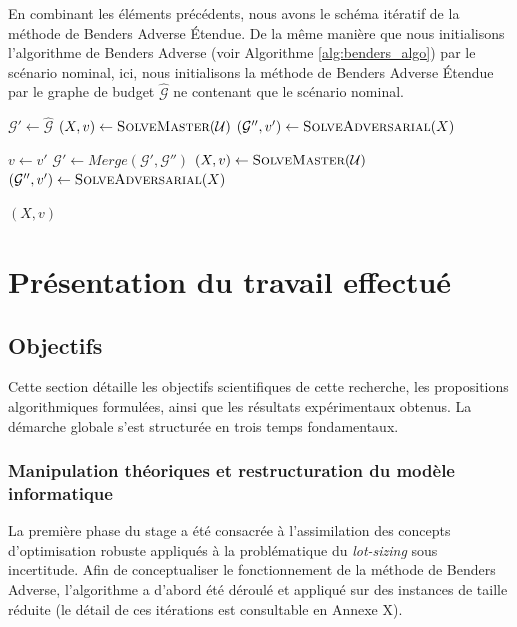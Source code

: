 \documentclass[12pt, a4paper, twoside]{report}
\numberwithin{equation}{section}
\begin{document}
\begin{Figure}[H]
	En combinant les éléments précédents, nous avons le schéma itératif de la méthode de Benders Adverse Étendue. De la même manière que nous initialisons l'algorithme de Benders Adverse (voir Algorithme \ref{alg:benders_algo}) par le scénario nominal, ici, nous initialisons la méthode de Benders Adverse Étendue par le graphe de budget $\hat{\mathcal{G}}$ ne contenant que le scénario nominal.
	
	\begin{algorithm}[H]
		\caption{Extended Adversarial Benders Method}
		\label{alg:benders_algo_etendue}
		\begin{algorithmic}[1]
			\State $\mathcal{G}' \gets \hat{\mathcal{G}}$
			\State $(X,v) \gets \Call{SolveMaster}{\mathcal{U}}$
			\State $(\mathcal{G}'',v') \gets \Call{SolveAdversarial}{X}$
			
			\State $v \gets v'$
			\State $\mathcal{G}' \gets Merge(\mathcal{G}', \mathcal{G}'')$
			\State $(X,v) \gets \Call{SolveMaster}{\mathcal{U}}$
			\State $(\mathcal{G}'',v') \gets \Call{SolveAdversarial}{X}$
			\EndWhile
			
			\State \Return $(X,v)$
		\end{algorithmic}
	\end{algorithm}
	
	\clearpage
	\section{Présentation du travail effectué}
	
	\subsection{Objectifs}
	
	Cette section détaille les objectifs scientifiques de cette recherche, les propositions algorithmiques formulées, ainsi que les résultats expérimentaux obtenus. La démarche globale s'est structurée en trois temps fondamentaux.
	
	\subsubsection{Manipulation théoriques et restructuration du modèle informatique}
	
	La première phase du stage a été consacrée à l'assimilation des concepts d'optimisation robuste appliqués à la problématique du \textit{lot-sizing} sous incertitude. Afin de conceptualiser le fonctionnement de la méthode de Benders Adverse, l'algorithme a d'abord été déroulé et appliqué sur des instances de taille réduite (le détail de ces itérations est consultable en Annexe X).
	

\end{Figure}
\end{document}
